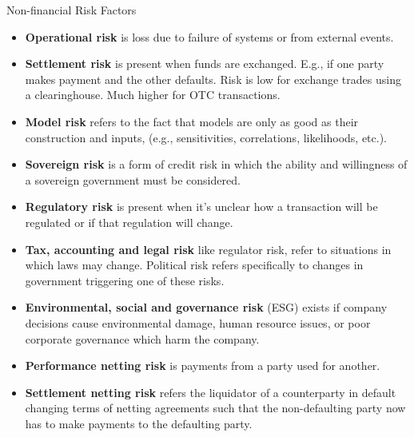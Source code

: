 \documentclass[../custom]{flashcards}
\begin{document}
\begin{flashcard}[\studyArea]{Non-financial Risk Factors}
    \vspace{-3mm}
    \begin{itemize}[itemsep=.2\itemsep]
        \item \textbf{Operational risk} is loss due to failure of systems or from external events.
        \item \textbf{Settlement risk} is present when funds are exchanged. E.g., if one party makes payment and the other defaults. Risk is low for exchange trades using a clearinghouse. Much higher for OTC transactions.
        \item \textbf{Model risk} refers to the fact that models are only as good as their construction and inputs, (e.g., sensitivities, correlations, likelihoods, etc.).
        \item \textbf{Sovereign risk} is a form of credit risk in which the ability and willingness of a sovereign government must be considered.
        \item \textbf{Regulatory risk} is present when it's unclear how a transaction will be regulated or if that regulation will change.
        \item \textbf{Tax, accounting and legal risk} like regulator risk, refer to situations in which laws may change. Political risk refers specifically to changes in government triggering one of these risks.
        \item \textbf{Environmental, social and governance risk} (ESG) exists if company decisions cause environmental damage, human resource issues, or poor corporate governance which harm the company.
        \item \textbf{Performance netting risk} is payments from a party used for another.
        \item \textbf{Settlement netting risk} refers the liquidator of a counterparty in default changing terms of netting agreements such that the non-defaulting party now has to make payments to the defaulting party.
    \end{itemize}
\end{flashcard}
\end{document}
